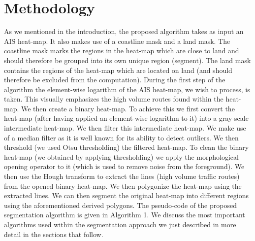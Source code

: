 \documentclass{article}
\begin{document}
\section{Methodology}
\label{sec:met}
As we mentioned in the introduction, the proposed algorithm takes as input an AIS heat-map. It also makes use of a coastline mask and a land mask. The coastline mask
marks the regions in the heat-map which are close to land and should therefore be grouped into its own unique region (segment). The land mask contains the regions of the heat-map which 
are located on land (and should therefore be excluded from the computation). During the first step of the algorithm the element-wise logarithm of the AIS heat-map, we wish to process, is taken. This visually emphasizes the high volume routes found within the heat-map. We then 
create a binary heat-map. To achieve this we first convert the heat-map (after having applied an element-wise logarithm to it) into a gray-scale intermediate heat-map. We then filter this intermediate heat-map. We make use of a median filter as it is well known for its ability to detect outliers. We then threshold (we used Otsu thresholding) the  
filtered heat-map. To clean the binary heat-map (we obtained by applying thresholding) we apply the morphological opening operator to it (which is used to remove noise from the foreground).
We then use the Hough transform to extract the lines (high volume traffic routes) from the opened binary heat-map. We then polygonize the heat-map using the extracted lines. We can then 
segment the original heat-map into different regions using the aforementioned derived polygons. The pseudo-code of the proposed segmentation algorithm is given in Algorithm 1. We discuss the most important algorithms used within the segmentation approach we 
just described in more detail in the sections that follow.  
\end{document}
